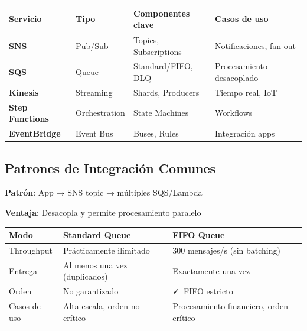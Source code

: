 \documentclass[12pt,a4paper]{report}
\newcommand{\awsservice}[1]{\textcolor{awsorange}{\textbf{#1}}}
\newcommand{\vcheckmark}{\textcolor{successgreen}{\faCheck}}
\begin{document}
\begin{center}
\begin{longtable}{|p{2.5cm}|p{2cm}|p{4cm}|p{4cm}|}
\hline
\cellcolor{awsblue!20}\textbf{Servicio} & \cellcolor{awsblue!20}\textbf{Tipo} & \cellcolor{awsblue!20}\textbf{Componentes clave} & \cellcolor{awsblue!20}\textbf{Casos de uso} \\
\hline
\awsservice{SNS} & Pub/Sub & Topics, Subscriptions & Notificaciones, fan-out \\
\hline
\awsservice{SQS} & Queue & Standard/FIFO, DLQ & Procesamiento desacoplado \\
\hline
\awsservice{Kinesis} & Streaming & Shards, Producers & Tiempo real, IoT \\
\hline
\awsservice{Step Functions} & Orchestration & State Machines & Workflows \\
\hline
\awsservice{EventBridge} & Event Bus & Buses, Rules & Integración apps \\
\hline
\end{longtable}
\end{center}

\subsection{Patrones de Integración Comunes}

\begin{tipbox}
\textbf{Patrón}: App → SNS topic → múltiples SQS/Lambda

\textbf{Ventaja}: Desacopla y permite procesamiento paralelo
\end{tipbox}

\begin{conceptbox}
\begin{center}
\begin{longtable}{|p{3cm}|p{5cm}|p{5cm}|}
\hline
\cellcolor{awsblue!20}\textbf{Modo} & \cellcolor{awsblue!20}\textbf{Standard Queue} & \cellcolor{awsblue!20}\textbf{FIFO Queue} \\
\hline
Throughput & Prácticamente ilimitado & 300 mensajes/s (sin batching) \\
\hline
Entrega & Al menos una vez (duplicados) & Exactamente una vez \\
\hline
Orden & No garantizado & \vcheckmark\ FIFO estricto \\
\hline
Casos de uso & Alta escala, orden no crítico & Procesamiento financiero, orden crítico \\
\hline
\end{longtable}
\end{center}
\end{conceptbox}
\end{document}
